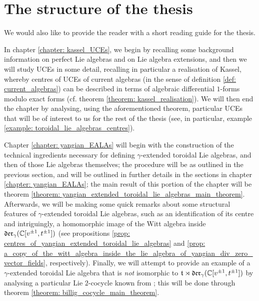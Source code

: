 \section{The structure of the thesis}
    We would also like to provide the reader with a short reading guide for the thesis.
    
    In chapter \ref{chapter: kassel_UCEs}, we begin by recalling some background information on perfect Lie algebras and on Lie algebra extensions, and then we will study UCEs in some detail, recalling in particular a realisation of Kassel, whereby centres of UCEs of current algebras (in the sense of definition \ref{def: current_algebras}) can be described in terms of algebraic differential $1$-forms modulo exact forms (cf. theorem \ref{theorem: kassel_realisation}). We will then end the chapter by analysing, using the aforementioned theorem, particular UCEs that will be of interest to us for the rest of the thesis (see, in particular, example \ref{example: toroidal_lie_algebras_centres}).

    Chapter \ref{chapter: yangian_EALAs} will begin with the construction of the technical ingredients necessary for defining $\gamma$-extended toroidal Lie algebras, and then of those Lie algebras themselves; the procedure will be as outlined in the previous section, and will be outlined in further details in the sections in chapter \ref{chapter: yangian_EALAs}; the main result of this portion of the chapter will be theorem \ref{theorem: yangian_extended_toroidal_lie_algebras_main_theorem}. Afterwards, we will be making some quick remarks about some structural features of $\gamma$-extended toroidal Lie algebras, such as an identification of its centre and intriguingly, a homomorphic image of the Witt algebra inside $\mathfrak{der}_{\gamma}(\mathbb{C}[v^{\pm 1}, t^{\pm 1}])$ (see propositions \ref{prop: centres_of_yangian_extended_toroidal_lie_algebras} and \ref{prop: a_copy_of_the_witt_algebra_inside_the_lie_algebra_of_yangian_div_zero_vector_fields}, respectively). Finally, we will attempt to provide an example of a $\gamma$-extended toroidal Lie algebra that is \textit{not} isomorphic to $\mathfrak{t} \rtimes \mathfrak{der}_{\gamma}(\mathbb{C}[v^{\pm 1}, t^{\pm 1}])$ by analysing a particular Lie $2$-cocycle known from \cite{billig_energy_momentum_tensor}; this will be done through theorem \ref{theorem: billig_cocycle_main_theorem}.
